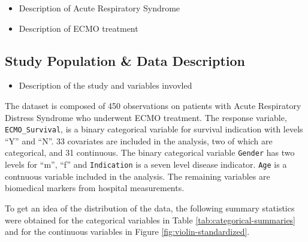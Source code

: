 \documentclass[12pt,]{article}
\providecommand{\tightlist}{%
  \setlength{\itemsep}{0pt}\setlength{\parskip}{0pt}}
\begin{document}
\begin{itemize}
\tightlist
\item
  Description of Acute Respiratory Syndrome
\item
  Description of ECMO treatment
\end{itemize}

\subsection{Study Population \& Data
Description}\label{study-population-data-description}

\begin{itemize}
\tightlist
\item
  Description of the study and variables invovled
\end{itemize}

The dataset is composed of 450 observations on patients with Acute
Respiratory Distress Syndrome who underwent ECMO treatment. The response
variable, \texttt{ECMO\_Survival}, is a binary categorical variable for
survival indication with levels ``Y'' and ``N''. 33 covariates are
included in the analysis, two of which are categorical, and 31
continuous. The binary categorical variable \texttt{Gender} has two
levels for ``m'', ``f'' and \texttt{Indication} is a seven level disease
indicator. \texttt{Age} is a contnuous variable included in the
analysis. The remaining variables are biomedical markers from hospital
measurements.

To get an idea of the distribution of the data, the following summary
statistics were obtained for the categorical variables in Table
\ref{tab:categorical-summaries} and for the continuous variables in
Figure \ref{fig:violin-standardized}.
\end{document}
